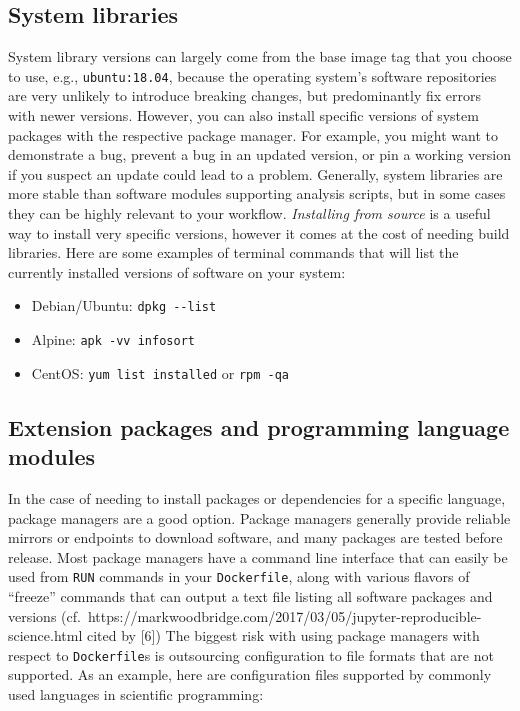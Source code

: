 \documentclass[10pt,letterpaper]{article}
\providecommand{\tightlist}{%
  \setlength{\itemsep}{0pt}\setlength{\parskip}{0pt}}
\begin{document}
\hypertarget{system-libraries}{%
\subsection{System libraries}\label{system-libraries}}

System library versions can largely come from the base image tag that
you choose to use, e.g., \texttt{ubuntu:18.04}, because the operating
system's software repositories are very unlikely to introduce breaking
changes, but predominantly fix errors with newer versions. However, you
can also install specific versions of system packages with the
respective package manager. For example, you might want to demonstrate a
bug, prevent a bug in an updated version, or pin a working version if
you suspect an update could lead to a problem. Generally, system
libraries are more stable than software modules supporting analysis
scripts, but in some cases they can be highly relevant to your workflow.
\emph{Installing from source} is a useful way to install very specific
versions, however it comes at the cost of needing build libraries. Here
are some examples of terminal commands that will list the currently
installed versions of software on your system:

\begin{itemize}
\tightlist
\item
  Debian/Ubuntu: \texttt{dpkg\ -\/-list}
\item
  Alpine: \texttt{apk\ -vv\ info\textbar{}sort}
\item
  CentOS: \texttt{yum\ list\ installed} or \texttt{rpm\ -qa}
\end{itemize}

\hypertarget{extension-packages-and-programming-language-modules}{%
\subsection{Extension packages and programming language
modules}\label{extension-packages-and-programming-language-modules}}

In the case of needing to install packages or dependencies for a
specific language, package managers are a good option. Package managers
generally provide reliable mirrors or endpoints to download software,
and many packages are tested before release. Most package managers have
a command line interface that can easily be used from \texttt{RUN}
commands in your \texttt{Dockerfile}, along with various flavors of
``freeze'' commands that can output a text file listing all software
packages and versions
(cf.~https://markwoodbridge.com/2017/03/05/jupyter-reproducible-science.html
cited by {[}6{]}) The biggest risk with using package managers with
respect to \texttt{Dockerfile}s is outsourcing configuration to file
formats that are not supported. As an example, here are configuration
files supported by commonly used languages in scientific programming:
\end{document}
